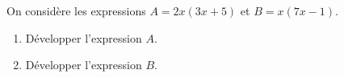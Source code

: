 \documentclass{article}
\begin{document}
\begin{exoo}[][style7]
On considère les expressions $A=2x(3x+5)$ et $B=x(7x-1)$.
\begin{enumerate}
\item  Développer l'expression $A$.\newline
{}
\item  Développer l'expression $B$.
\end{enumerate}
\end{exoo}
















%
%
\end{document}
